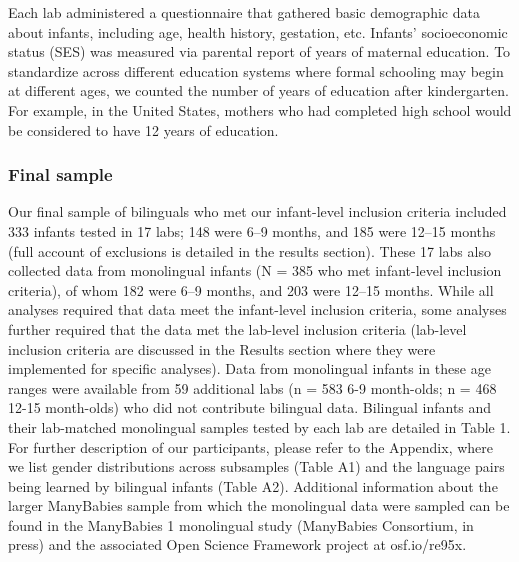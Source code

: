 \documentclass[,man,floatsintext]{apa6}
\begin{document}
Each lab administered a questionnaire that gathered basic demographic data about infants, including age, health history, gestation, etc. Infants' socioeconomic status (SES) was measured via parental report of years of maternal education. To standardize across different education systems where formal schooling may begin at different ages, we counted the number of years of education after kindergarten. For example, in the United States, mothers who had completed high school would be considered to have 12 years of education.

\hypertarget{final-sample}{%
\subsubsection{Final sample}\label{final-sample}}

Our final sample of bilinguals who met our infant-level inclusion criteria included 333 infants tested in 17 labs; 148 were 6--9 months, and 185 were 12--15 months (full account of exclusions is detailed in the results section). These 17 labs also collected data from monolingual infants (N = 385 who met infant-level inclusion criteria), of whom 182 were 6--9 months, and 203 were 12--15 months. While all analyses required that data meet the infant-level inclusion criteria, some analyses further required that the data met the lab-level inclusion criteria (lab-level inclusion criteria are discussed in the Results section where they were implemented for specific analyses). Data from monolingual infants in these age ranges were available from 59 additional labs (n = 583 6-9 month-olds; n = 468 12-15 month-olds) who did not contribute bilingual data. Bilingual infants and their lab-matched monolingual samples tested by each lab are detailed in Table 1. For further description of our participants, please refer to the Appendix, where we list gender distributions across subsamples (Table A1) and the language pairs being learned by bilingual infants (Table A2). Additional information about the larger ManyBabies sample from which the monolingual data were sampled can be found in the ManyBabies 1 monolingual study (ManyBabies Consortium, in press) and the associated Open Science Framework project at osf.io/re95x.

\begingroup\fontsize{11}{13}\selectfont
\end{document}
